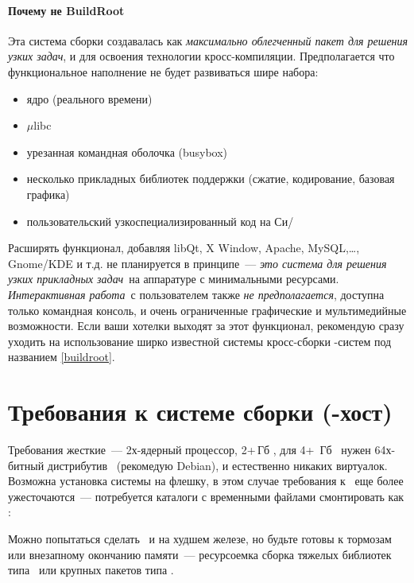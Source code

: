 \paragraph{Почему не BuildRoot}

Эта система сборки создавалась как \emph{максимально облегченный пакет
для решения узких задач}, и для освоения технологии кросс-компиляции.
Предполагается что функциональное наполнение не будет развиваться шире набора:

\begin{itemize}
  \item ядро (реального времени)
  \item $\mu$libc
  \item урезанная командная оболочка (busybox)
  \item несколько прикладных библиотек поддержки (сжатие, кодирование, базовая
  графика)
  \item пользовательский узкоспециализированный код на Си/\cpp
\end{itemize}

Расширять функционал, добавляя libQt, X Window, Apache, MySQL,\ldots, Gnome/KDE
и т.д. не планируется в принципе\ --- \emph{это система для решения узких
прикладных задач}\ на аппаратуре с минимальными ресурсами. \emph{Интерактивная работа}\ с пользователем также
\emph{не предполагается}, доступна только командная консоль, и очень ограниченные графические и мультимедийные
возможности. Если ваши хотелки выходят за этот функционал, рекомендую сразу
уходить на использование ширко известной системы кросс-сборки \linux-систем под
названием \ref{buildroot}.

\section{Требования к системе сборки (-хост)}

Требования жесткие\ --- 2х-ядерный процессор, 2+\,Гб \ram, для 4+\, Гб \ram\
нужен 64х-битный дистрибутив \linux\ (рекомедую Debian), и естественно никаких
виртуалок.
Возможна установка системы на флешку, в этом случае требования к \ram\ еще более
ужесточаются\ --- потребуется каталоги с временными файлами смонтировать как
\file{tmpfs}:


Можно попытаться сделать \ и на худшем железе, но будьте
готовы к тормозам или внезапному окончанию памяти\ --- ресурсоемка сборка
тяжелых библиотек типа \prog{libQt}\ или крупных пакетов типа \prog{gcc}.


